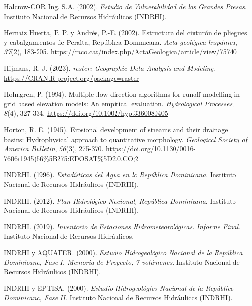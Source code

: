 \documentclass[spanish]{article}
\newlength{\cslhangindent}
\newlength{\cslentryspacingunit} %
\newenvironment{CSLReferences}[2] %
 {%
  \setlength{\parindent}{0pt}
  \ifodd #1
  \let\oldpar\par
  \def\par{\hangindent=\cslhangindent\oldpar}
  \fi
  \setlength{\parskip}{#2\cslentryspacingunit}
 }%
 {}
\begin{document}
\begin{CSLReferences}{1}{0}
\leavevmode{}%
Halcrow-COR Ing. S.A. (2002). \emph{{Estudio de Vulnerabilidad de las
Grandes Presas}}. {Instituto Nacional de Recursos Hidráulicos (INDRHI)}.

\leavevmode{}%
Hernaiz Huerta, P. P. y Andrés, P.-E. (2002). Estructura del cinturón de
pliegues y cabalgamientos de Peralta, República Dominicana. \emph{Acta
geológica hispánica}, \emph{37}(2), 183-205.
\url{https://raco.cat/index.php/ActaGeologica/article/view/75740}

\leavevmode{}%
Hijmans, R. J. (2023). \emph{raster: Geographic Data Analysis and
Modeling}. \url{https://CRAN.R-project.org/package=raster}

\leavevmode{}%
Holmgren, P. (1994). Multiple flow direction algorithms for runoff
modelling in grid based elevation models: An empirical evaluation.
\emph{Hydrological Processes}, \emph{8}(4), 327-334.
\url{https://doi.org/10.1002/hyp.3360080405}

\leavevmode{}%
Horton, R. E. (1945). {Erosional development of streams and their
drainage basins: Hydrophysical approach to quantitative morphology}.
\emph{Geological Society of America Bulletin}, \emph{56}(3), 275-370.
\url{https://doi.org/10.1130/0016-7606(1945)56\%5B275:EDOSAT\%5D2.0.CO;2}

\leavevmode{}%
INDRHI. (1996). \emph{{Estadísticas del Agua en la República
Dominicana}}. {Instituto Nacional de Recursos Hidráulicos (INDRHI)}.

\leavevmode{}%
INDRHI. (2012). \emph{{Plan Hidrológico Nacional, República
Dominicana}}. {Instituto Nacional de Recursos Hidráulicos (INDRHI)}.

\leavevmode{}%
INDRHI. (2019). \emph{{Inventario de Estaciones Hidrometeorológicas.
Informe Final}}. {Instituto Nacional de Recursos Hidráulicos}.

\leavevmode{}%
INDRHI y AQUATER. (2000). \emph{{Estudio Hidrogeológico Nacional de la
República Dominicana, Fase I. Memoria de Proyecto, 7 volúmenes}}.
{Instituto Nacional de Recursos Hidráulicos (INDRHI)}.

\leavevmode{}%
INDRHI y EPTISA. (2000). \emph{{Estudio Hidrogeológico Nacional de la
República Dominicana, Fase II}}. {Instituto Nacional de Recursos
Hidráulicos (INDRHI)}.


\end{CSLReferences}
\end{document}
